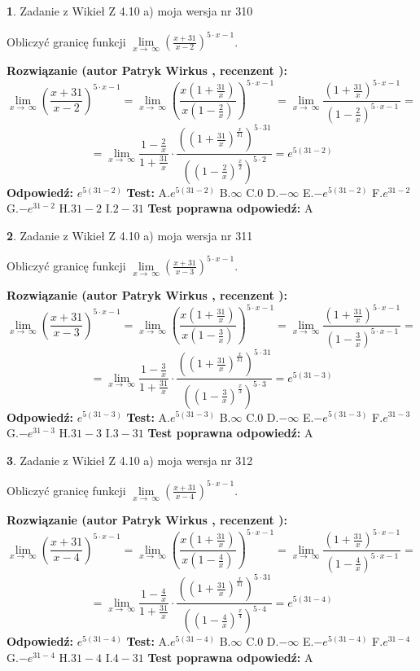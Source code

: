 \documentclass[12pt, a4paper]{article}
\theoremstyle{definition} %
\newtheorem{zad}{}
\newcommand{\zadStart}[1]{\begin{zad}#1\newline}
\newcommand{\zadStop}{\end{zad}}
\newcommand{\rozwStart}[2]{\noindent \textbf{Rozwiązanie (autor #1 , recenzent #2): }\newline}
\newcommand{\rozwStop}{\newline}
\newcommand{\odpStart}{\noindent \textbf{Odpowiedź:}\newline}
\newcommand{\odpStop}{\newline}
\newcommand{\testStart}{\noindent \textbf{Test:}\newline}
\newcommand{\testStop}{\newline}
\newcommand{\kluczStart}{\noindent \textbf{Test poprawna odpowiedź:}\newline}
\newcommand{\kluczStop}{\newline}
\begin{document}
\zadStart{Zadanie z Wikieł Z 4.10 a) moja wersja nr 310}


Obliczyć granicę funkcji  $\lim\limits_{x\to\ \infty}(\frac{x+31}{x-2})^{5\cdot x-1}$.
\zadStop
\rozwStart{Patryk Wirkus}{}
$$\lim\limits_{x\to\ \infty}(\frac{x+31}{x-2})^{5\cdot x-1} = \lim\limits_{x\to\ \infty}(\frac{x(1+\frac{31}{x})}{x(1-\frac{2}{x})})^{5\cdot x-1}=\lim\limits_{x\to\ \infty}\frac{(1+\frac{31}{x})^{5\cdot x-1}}{(1-\frac{2}{x})^{5\cdot x-1}}=$$
$$=\lim\limits_{x\to\ \infty}\frac{1-\frac{2}{x}}{1+\frac{31}{x}}\cdot\frac{((1+\frac{31}{x})^{\frac{x}{31}})^{5\cdot31}}{((1-\frac{2}{x})^{\frac{x}{2}})^{5\cdot2}}=e^{5(31-2)}$$
\rozwStop
\odpStart
$e^{5(31-2)}$
\odpStop
\testStart
A.$e^{5(31-2)}$ B.$\infty$ C.$0$ D.$-\infty$ E.$-e^{5(31-2)}$
F.$e^{31-2}$ G.$-e^{31-2}$
H.$31-2$
I.$2-31$
\testStop
\kluczStart
A
\kluczStop



\zadStart{Zadanie z Wikieł Z 4.10 a) moja wersja nr 311}


Obliczyć granicę funkcji  $\lim\limits_{x\to\ \infty}(\frac{x+31}{x-3})^{5\cdot x-1}$.
\zadStop
\rozwStart{Patryk Wirkus}{}
$$\lim\limits_{x\to\ \infty}(\frac{x+31}{x-3})^{5\cdot x-1} = \lim\limits_{x\to\ \infty}(\frac{x(1+\frac{31}{x})}{x(1-\frac{3}{x})})^{5\cdot x-1}=\lim\limits_{x\to\ \infty}\frac{(1+\frac{31}{x})^{5\cdot x-1}}{(1-\frac{3}{x})^{5\cdot x-1}}=$$
$$=\lim\limits_{x\to\ \infty}\frac{1-\frac{3}{x}}{1+\frac{31}{x}}\cdot\frac{((1+\frac{31}{x})^{\frac{x}{31}})^{5\cdot31}}{((1-\frac{3}{x})^{\frac{x}{3}})^{5\cdot3}}=e^{5(31-3)}$$
\rozwStop
\odpStart
$e^{5(31-3)}$
\odpStop
\testStart
A.$e^{5(31-3)}$ B.$\infty$ C.$0$ D.$-\infty$ E.$-e^{5(31-3)}$
F.$e^{31-3}$ G.$-e^{31-3}$
H.$31-3$
I.$3-31$
\testStop
\kluczStart
A
\kluczStop



\zadStart{Zadanie z Wikieł Z 4.10 a) moja wersja nr 312}


Obliczyć granicę funkcji  $\lim\limits_{x\to\ \infty}(\frac{x+31}{x-4})^{5\cdot x-1}$.
\zadStop
\rozwStart{Patryk Wirkus}{}
$$\lim\limits_{x\to\ \infty}(\frac{x+31}{x-4})^{5\cdot x-1} = \lim\limits_{x\to\ \infty}(\frac{x(1+\frac{31}{x})}{x(1-\frac{4}{x})})^{5\cdot x-1}=\lim\limits_{x\to\ \infty}\frac{(1+\frac{31}{x})^{5\cdot x-1}}{(1-\frac{4}{x})^{5\cdot x-1}}=$$
$$=\lim\limits_{x\to\ \infty}\frac{1-\frac{4}{x}}{1+\frac{31}{x}}\cdot\frac{((1+\frac{31}{x})^{\frac{x}{31}})^{5\cdot31}}{((1-\frac{4}{x})^{\frac{x}{4}})^{5\cdot4}}=e^{5(31-4)}$$
\rozwStop
\odpStart
$e^{5(31-4)}$
\odpStop
\testStart
A.$e^{5(31-4)}$ B.$\infty$ C.$0$ D.$-\infty$ E.$-e^{5(31-4)}$
F.$e^{31-4}$ G.$-e^{31-4}$
H.$31-4$
I.$4-31$
\testStop
\kluczStart
A
\kluczStop
\end{document}
